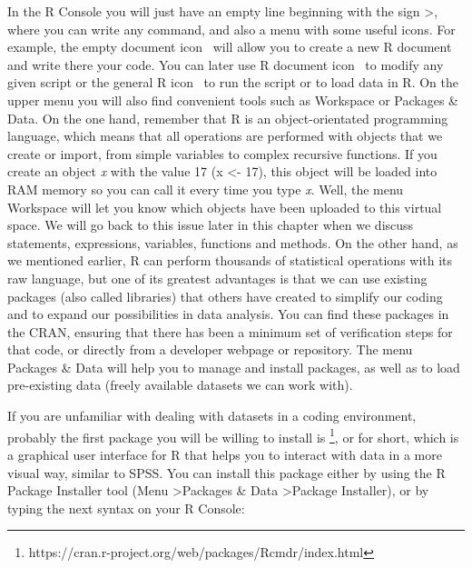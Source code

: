 In the R Console you will just have an empty line beginning with the
sign \textgreater, where you can write any command, and also a menu
with some useful icons. For example, the empty document icon \icon
\ will allow you to create a new R document and write there your
code. You can later use R document icon \doc \ to modify any given
script or the general R icon \rcom \ to run the script or to load data
in R. On the upper menu you will also find convenient tools such as
Workspace or Packages \& Data. On the one hand, remember that R is an
object-orientated programming language, which means that all
operations are performed with objects that we create or import, from
simple variables to complex recursive functions. If you create an
object \emph{x} with the value 17 (x \textless- 17), this object will
be loaded into RAM memory so you can call it every time you type
\emph{x}.  Well, the menu Workspace will let you know which objects
have been uploaded to this virtual space. We will go back to this
issue later in this chapter when we discuss statements, expressions,
variables, functions and methods. On the other hand, as we mentioned
earlier, R can perform thousands of statistical operations with its
raw language, but one of its greatest advantages is that we can use
existing packages (also called libraries) that others have created to
simplify our coding and to expand our possibilities in data
analysis. You can find these packages in the CRAN, ensuring that there
has been a minimum set of verification steps for that code, or
directly from a developer webpage or repository. The menu Packages \&
Data will help you to manage and install packages, as well as to load
pre-existing data (freely available datasets we can work with).

If you are unfamiliar with dealing with datasets in a coding
environment, probably the first package you will be willing to install
is \footnote{https://cran.r-project.org/web/packages/Rcmdr/index.html},
or  for short, which is a graphical user interface for R that
helps you to interact with data in a more visual way, similar to SPSS.
You can install this package either by using the R Package Installer
tool (Menu \textgreater Packages \& Data \textgreater Package
Installer), or by typing the next syntax on your R Console:


